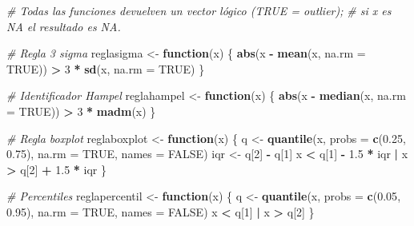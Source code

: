 \documentclass[
]{article}
\newenvironment{Shaded}{\begin{snugshade}}{\end{snugshade}}
\newcommand{\AttributeTok}[1]{\textcolor[rgb]{0.13,0.29,0.53}{#1}}
\newcommand{\CommentTok}[1]{\textcolor[rgb]{0.56,0.35,0.01}{\textit{#1}}}
\newcommand{\ConstantTok}[1]{\textcolor[rgb]{0.56,0.35,0.01}{#1}}
\newcommand{\ControlFlowTok}[1]{\textcolor[rgb]{0.13,0.29,0.53}{\textbf{#1}}}
\newcommand{\DecValTok}[1]{\textcolor[rgb]{0.00,0.00,0.81}{#1}}
\newcommand{\FloatTok}[1]{\textcolor[rgb]{0.00,0.00,0.81}{#1}}
\newcommand{\FunctionTok}[1]{\textcolor[rgb]{0.13,0.29,0.53}{\textbf{#1}}}
\newcommand{\NormalTok}[1]{#1}
\newcommand{\OtherTok}[1]{\textcolor[rgb]{0.56,0.35,0.01}{#1}}
\newcommand{\SpecialCharTok}[1]{\textcolor[rgb]{0.81,0.36,0.00}{\textbf{#1}}}
\begin{document}
\begin{Shaded}
\begin{Highlighting}[]
\CommentTok{\# Todas las funciones devuelven un vector lógico (TRUE = outlier);}
\CommentTok{\# si x es NA el resultado es NA.}

\CommentTok{\# Regla 3 sigma}
\NormalTok{reglasigma }\OtherTok{\textless{}{-}} \ControlFlowTok{function}\NormalTok{(x) \{}
  \FunctionTok{abs}\NormalTok{(x }\SpecialCharTok{{-}} \FunctionTok{mean}\NormalTok{(x, }\AttributeTok{na.rm =} \ConstantTok{TRUE}\NormalTok{)) }\SpecialCharTok{\textgreater{}} \DecValTok{3} \SpecialCharTok{*} \FunctionTok{sd}\NormalTok{(x, }\AttributeTok{na.rm =} \ConstantTok{TRUE}\NormalTok{)}
\NormalTok{\}}

\CommentTok{\# Identificador Hampel}
\NormalTok{reglahampel }\OtherTok{\textless{}{-}} \ControlFlowTok{function}\NormalTok{(x) \{}
  \FunctionTok{abs}\NormalTok{(x }\SpecialCharTok{{-}} \FunctionTok{median}\NormalTok{(x, }\AttributeTok{na.rm =} \ConstantTok{TRUE}\NormalTok{)) }\SpecialCharTok{\textgreater{}} \DecValTok{3} \SpecialCharTok{*} \FunctionTok{madm}\NormalTok{(x)}
\NormalTok{\}}

\CommentTok{\# Regla boxplot}
\NormalTok{reglaboxplot }\OtherTok{\textless{}{-}} \ControlFlowTok{function}\NormalTok{(x) \{}
\NormalTok{  q }\OtherTok{\textless{}{-}} \FunctionTok{quantile}\NormalTok{(x, }\AttributeTok{probs =} \FunctionTok{c}\NormalTok{(}\FloatTok{0.25}\NormalTok{, }\FloatTok{0.75}\NormalTok{), }\AttributeTok{na.rm =} \ConstantTok{TRUE}\NormalTok{, }\AttributeTok{names =} \ConstantTok{FALSE}\NormalTok{)}
\NormalTok{  iqr }\OtherTok{\textless{}{-}}\NormalTok{ q[}\DecValTok{2}\NormalTok{] }\SpecialCharTok{{-}}\NormalTok{ q[}\DecValTok{1}\NormalTok{]}
\NormalTok{  x }\SpecialCharTok{\textless{}}\NormalTok{ q[}\DecValTok{1}\NormalTok{] }\SpecialCharTok{{-}} \FloatTok{1.5} \SpecialCharTok{*}\NormalTok{ iqr }\SpecialCharTok{|}\NormalTok{ x }\SpecialCharTok{\textgreater{}}\NormalTok{ q[}\DecValTok{2}\NormalTok{] }\SpecialCharTok{+} \FloatTok{1.5} \SpecialCharTok{*}\NormalTok{ iqr}
\NormalTok{\}}

\CommentTok{\# Percentiles}
\NormalTok{reglapercentil }\OtherTok{\textless{}{-}} \ControlFlowTok{function}\NormalTok{(x) \{}
\NormalTok{  q }\OtherTok{\textless{}{-}} \FunctionTok{quantile}\NormalTok{(x, }\AttributeTok{probs =} \FunctionTok{c}\NormalTok{(}\FloatTok{0.05}\NormalTok{, }\FloatTok{0.95}\NormalTok{), }\AttributeTok{na.rm =} \ConstantTok{TRUE}\NormalTok{, }\AttributeTok{names =} \ConstantTok{FALSE}\NormalTok{)}
\NormalTok{  x }\SpecialCharTok{\textless{}}\NormalTok{ q[}\DecValTok{1}\NormalTok{] }\SpecialCharTok{|}\NormalTok{ x }\SpecialCharTok{\textgreater{}}\NormalTok{ q[}\DecValTok{2}\NormalTok{]}
\NormalTok{\}}
\end{Highlighting}
\end{Shaded}
\end{document}
